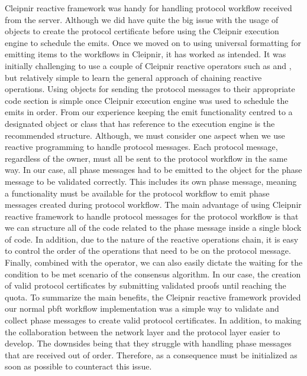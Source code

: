 Cleipnir reactive framework was handy for handling protocol workflow received from the server. Although we did have quite the big issue with the usage of  objects to create the protocol certificate before using the Cleipnir execution engine to schedule the emits. Once we moved on to using universal formatting for emitting items to the workflows in Cleipnir, it has worked as intended. It was initially challenging to use a couple of Cleipnir reactive operators such as  and , but relatively simple to learn the general approach of chaining reactive operations. Using  objects for sending the protocol messages to their appropriate code section is simple once Cleipnir execution engine was used to schedule the emits in order. From our experience keeping the emit functionality centred to a designated object or class that has reference to the execution engine is the recommended structure. Although, we must consider one aspect when we use reactive programming to handle protocol messages. Each protocol message, regardless of the owner, must all be sent to the protocol workflow in the same way. In our case, all phase messages had to be emitted to the  object for the phase message to be validated correctly. This includes its own phase message, meaning a functionality must be available for the protocol workflow to emit phase messages created during protocol workflow. The main advantage of using Cleipnir reactive framework to handle protocol messages for the protocol workflow is that we can structure all of the code related to the phase message inside a single block of code. In addition, due to the nature of the reactive operations chain, it is easy to control the order of the operations that need to be on the protocol message. Finally, combined with the  operator, we can also easily dictate the waiting for the condition to be met scenario of the consensus algorithm. In our case, the creation of valid protocol certificates by submitting validated proofs until reaching the quota.
To summarize the main benefits, the Cleipnir reactive framework provided our normal \ac{pbft} workflow implementation was a simple way to validate and collect phase messages to create valid protocol certificates.  In addition, to making the collaboration between the network layer and the protocol layer easier to develop. The downsides being that they struggle with handling phase messages that are received out of order. Therefore, as a consequence must be initialized as soon as possible to counteract this issue. 

